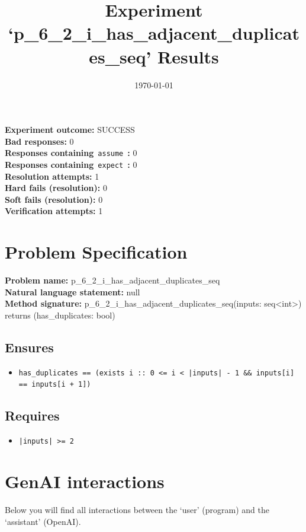 \documentclass{article}
\begin{document}
\title{Experiment `p\_6\_2\_i\_has\_adjacent\_duplicates\_seq' Results}
\author{\today}
\date{}
\maketitle
\textbf{Experiment outcome: }SUCCESS
\\\textbf{Bad responses: }0
\\\textbf{Responses containing}~\texttt{assume}~\textbf{: }0
\\\textbf{Responses containing}~\texttt{expect}~\textbf{: }0
\\\textbf{Resolution attempts: }1
\\\textbf{Hard fails (resolution): }0
\\\textbf{Soft fails (resolution): }0
\\\textbf{Verification attempts: }1
\section*{Problem Specification}
\textbf{Problem name: }p\_6\_2\_i\_has\_adjacent\_duplicates\_seq
\\\textbf{Natural language statement: }null
\\\textbf{Method signature: }p\_6\_2\_i\_has\_adjacent\_duplicates\_seq(inputs: seq<int>) returns (has\_duplicates: bool)
\subsection*{Ensures}
\begin{itemize}
\item \texttt{has\_duplicates == (exists i :: 0 <= i < |inputs| - 1 \&\& inputs[i] == inputs[i + 1])}
\end{itemize}
\subsection*{Requires}
\begin{itemize}
\item \texttt{|inputs| >= 2}
\end{itemize}
\clearpage
\section*{GenAI interactions}
Below you will find all interactions between the `user' (program) and the `assistant' (OpenAI).
\end{document}
